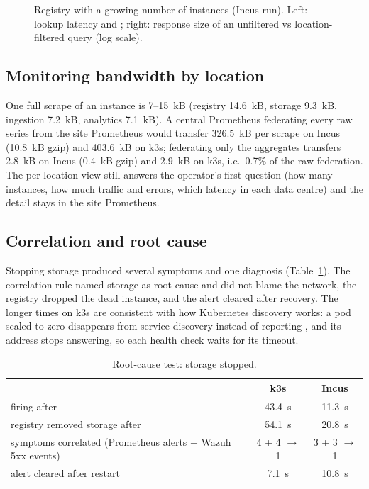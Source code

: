 \begin{figure}[ht]
\centering

\caption{Registry with a growing number of instances (Incus run). Left: lookup latency and
; right: response size of an unfiltered vs location-filtered query (log scale).}
\label{fig:registry}
\end{figure}

\subsection{Monitoring bandwidth by location}

One full scrape of an instance is 7--15~kB (registry 14.6~kB, storage 9.3~kB, ingestion 7.2~kB,
analytics 7.1~kB). A central Prometheus federating every raw series from the site Prometheus would
transfer 326.5~kB per scrape on Incus (10.8~kB gzip) and 403.6~kB on k3s; federating only the
 aggregates transfers 2.8~kB on Incus (0.4~kB gzip) and 2.9~kB on k3s, i.e.\
0.7\% of the raw federation. The per-location view still answers the operator's first question
(how many instances, how much traffic and errors, which latency in each data centre) and the
detail stays in the site Prometheus.

\subsection{Correlation and root cause}

Stopping storage produced several symptoms and one diagnosis (Table~\ref{tab:rootcause}). The
correlation rule named storage as root cause and did not blame the network, the registry dropped
the dead instance, and the alert cleared after recovery. The longer times on k3s are consistent with how
Kubernetes discovery works: a pod scaled to zero disappears from service discovery instead of reporting
\code{up == 0}, and its address stops answering, so each health check waits for its timeout.

\begin{table}[ht]
\centering\small
\caption{Root-cause test: storage stopped.}
\label{tab:rootcause}
\begin{tabular}{@{}l c c@{}}
\toprule
 & k3s & Incus \\
\midrule
\code{SSLERootCauseStorageDown} firing after & 43.4~s & 11.3~s \\
registry removed storage after & 54.1~s & 20.8~s \\
symptoms correlated (Prometheus alerts + Wazuh 5xx events) & 4 + 4 $\to$ 1 & 3 + 3 $\to$ 1 \\
alert cleared after restart & 7.1~s & 10.8~s \\
\bottomrule
\end{tabular}
\end{table}


